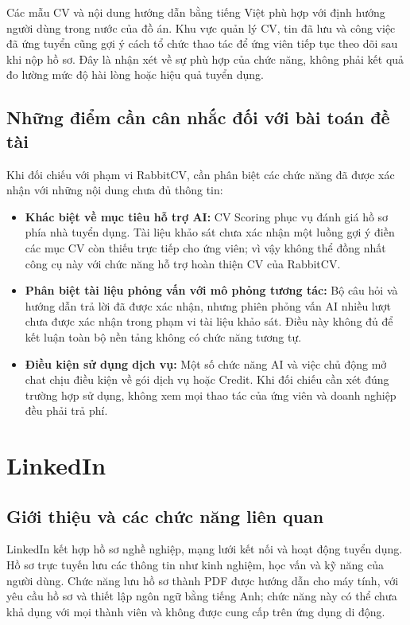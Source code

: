 Các mẫu CV và nội dung hướng dẫn bằng tiếng Việt phù hợp với định hướng người dùng trong nước của đồ án. Khu vực quản lý CV, tin đã lưu và công việc đã ứng tuyển cũng gợi ý cách tổ chức thao tác để ứng viên tiếp tục theo dõi sau khi nộp hồ sơ. Đây là nhận xét về sự phù hợp của chức năng, không phải kết quả đo lường mức độ hài lòng hoặc hiệu quả tuyển dụng.

\subsection{Những điểm cần cân nhắc đối với bài toán đề tài}

Khi đối chiếu với phạm vi RabbitCV, cần phân biệt các chức năng đã được xác nhận với những nội dung chưa đủ thông tin:

\begin{itemize}
    \item \textbf{Khác biệt về mục tiêu hỗ trợ AI:} CV Scoring phục vụ đánh giá hồ sơ phía nhà tuyển dụng. Tài liệu khảo sát chưa xác nhận một luồng gợi ý điền các mục CV còn thiếu trực tiếp cho ứng viên; vì vậy không thể đồng nhất công cụ này với chức năng hỗ trợ hoàn thiện CV của RabbitCV.
    \item \textbf{Phân biệt tài liệu phỏng vấn với mô phỏng tương tác:} Bộ câu hỏi và hướng dẫn trả lời đã được xác nhận, nhưng phiên phỏng vấn AI nhiều lượt chưa được xác nhận trong phạm vi tài liệu khảo sát. Điều này không đủ để kết luận toàn bộ nền tảng không có chức năng tương tự.
    \item \textbf{Điều kiện sử dụng dịch vụ:} Một số chức năng AI và việc chủ động mở chat chịu điều kiện về gói dịch vụ hoặc Credit. Khi đối chiếu cần xét đúng trường hợp sử dụng, không xem mọi thao tác của ứng viên và doanh nghiệp đều phải trả phí.
\end{itemize}

\section{LinkedIn}
\label{sec:survey-linkedin}

\subsection{Giới thiệu và các chức năng liên quan}

LinkedIn kết hợp hồ sơ nghề nghiệp, mạng lưới kết nối và hoạt động tuyển dụng. Hồ sơ trực tuyến lưu các thông tin như kinh nghiệm, học vấn và kỹ năng của người dùng. Chức năng lưu hồ sơ thành PDF được hướng dẫn cho máy tính, với yêu cầu hồ sơ và thiết lập ngôn ngữ bằng tiếng Anh; chức năng này có thể chưa khả dụng với mọi thành viên và không được cung cấp trên ứng dụng di động.

